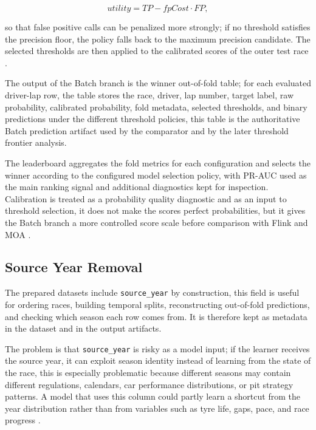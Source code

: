 \[
    utility = TP - fpCost \cdot FP,
\]

so that false positive calls can be penalized more strongly; if no threshold satisfies the precision floor, the policy falls back to the maximum precision candidate. The
selected thresholds are then applied to the calibrated scores of the outer test race \cite{elkan2001costsensitive}.

The output of the Batch branch is the winner out-of-fold table; for each evaluated driver-lap row, the table stores the race, driver, lap number, target label, raw probability,
calibrated probability, fold metadata, selected thresholds, and binary predictions under the different threshold policies, this table is the authoritative Batch prediction
artifact used by the comparator and by the later threshold frontier analysis.

The leaderboard aggregates the fold metrics for each configuration and selects the winner according to the configured model selection policy, with PR-AUC used as the main
ranking signal and additional diagnostics kept for inspection. Calibration is treated as a probability quality diagnostic and as an input to threshold selection, it does
not make the scores perfect probabilities, but it gives the Batch branch a more controlled score scale before comparison with Flink and MOA 
\cite{platt1999probabilistic,niculescu2005goodprob,guo2017calibration,kull2017beta,brier1950verification}.

\subsection{Source Year Removal}
\label{sec:source_year_removal}

The prepared datasets include \texttt{source\_year} by construction, this field is useful for ordering races, building temporal splits, reconstructing out-of-fold predictions,
and checking which season each row comes from. It is therefore kept as metadata in the dataset and in the output artifacts.

The problem is that \texttt{source\_year} is risky as a model input; if the learner receives the source year, it can exploit season identity instead of learning from the state of
the race, this is especially problematic because different seasons may contain different regulations, calendars, car performance distributions, or pit strategy patterns. A model
that uses this column could partly learn a shortcut from the year distribution rather than from variables such as tyre life, gaps, pace, and race progress \cite{brookshire2024leakage}.

